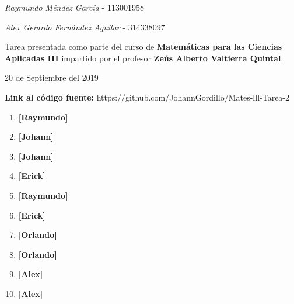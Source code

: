 \documentclass[10pt,letterpaper,fleqn]{article}
\begin{document}
\begin{titlepage}
	\vspace{1cm}    
    
    \large{\itshape{Raymundo Méndez García}} \small{ - 113001958} \\

	\vspace{1cm}    
    
    \large{\itshape{Alex Gerardo Fernández Aguilar}} \small{ - 314338097} \\
    
    \vspace{0.3cm}

    \vfill

    Tarea presentada como parte del curso de
    \textbf{Matemáticas para las Ciencias Aplicadas III}
    impartido por el profesor \textbf{Zeús Alberto Valtierra Quintal}. \par
    \vspace{0.2cm}
    {\large 20 de Septiembre del 2019\par}
    \vspace{0.3cm}
    \footnotesize{\textbf{Link al código fuente:} https://github.com/JohannGordillo/Mates-lll-Tarea-2}
\end{titlepage}


    \begin{enumerate}

        \item \textbf{[Raymundo]}

        \item \textbf{[Johann]}
        
        \item \textbf{[Johann]}

        \item \textbf{[Erick]}

        \item \textbf{[Raymundo]}
        
        \item \textbf{[Erick]}
        
        \item \textbf{[Orlando]}  
        
        \item \textbf{[Orlando]}
        
        \item \textbf{[Alex]}

        \item \textbf{[Alex]}                                      
    \end{enumerate}
        
\end{document}
